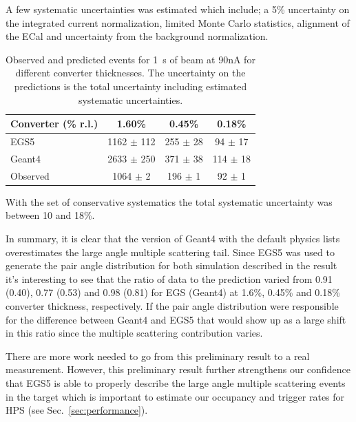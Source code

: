 A few systematic uncertainties was estimated which include; a 5\% uncertainty on the integrated 
current normalization, limited Monte Carlo statistics, alignment of the ECal and uncertainty 
from the background normalization. 
\begin{table}
\begin{tabular}{|l|c|c|c|}
\hline
Converter (\% r.l.) & 1.60\% & 0.45\% &	0.18\% \\
\hline
{\sc EGS5} &	1162 $\pm$ 112 &	255 $\pm$ 28 &	94 $\pm$ 17	\\
\hline
{\sc Geant4} & 2633 $\pm$ 250 & 	371 $\pm$ 38 &	114 $\pm$ 18 \\
\hline
Observed 	& 1064 $\pm$ 2 & 196 $\pm$ 1 &	92 $\pm$ 1 \\						
%						
\hline
\end{tabular}
\caption{ {\small Observed and predicted events for 1~s of beam at 90nA for different converter 
thicknesses. The uncertainty on the predictions is the total uncertainty including estimated 
systematic uncertainties. }}
\end{table}
With the set of conservative systematics the total systematic uncertainty was between 10 and 18\%. 

In summary, it is clear that the version of  
{\sc Geant4} with the default physics lists overestimates the large angle multiple scattering tail. 
Since {\sc EGS5} was used to generate the pair 
angle distribution for both simulation described in the result it's interesting to see that the 
ratio of data to the prediction varied from 0.91 (0.40), 0.77 (0.53) and 0.98 (0.81) for {\sc EGS} 
({\sc Geant4}) at 1.6\%, 0.45\% and 0.18\% converter thickness, respectively. If the pair angle 
distribution were responsible for the difference between {\sc Geant4}  and {\sc EGS5} that would show up as a large shift in this ratio since the multiple scattering contribution varies. 

There are more work needed to go from this preliminary result to a real 
measurement. However, this preliminary result further strengthens our confidence that 
{\sc EGS5} is able to properly describe the large angle multiple scattering events in the target 
which is important to estimate our occupancy and trigger rates for HPS (see Sec.~\ref{sec:performance}).
